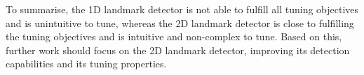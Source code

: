 To summarise, the 1D landmark detector is not able to fulfill all tuning objectives and is unintuitive to tune, whereas the 2D landmark detector is close to fulfilling the tuning objectives and is intuitive and non-complex to tune. Based on this, further work should focus on the 2D landmark detector, improving its detection capabilities and its tuning properties.  
